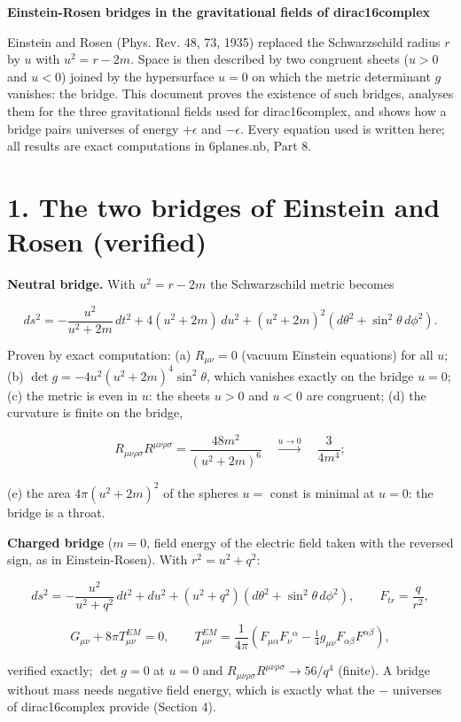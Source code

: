\documentclass[10pt]{article}
\makeatletter
\newcommand\keepnext{\par\nopagebreak\@nobreaktrue\everypar{\@nobreakfalse\everypar{}}}
\makeatother
\begin{document}
{\raggedright\LARGE\bfseries Einstein-Rosen bridges in the gravitational fields of dirac16complex\par}\medskip

Einstein and Rosen (Phys. Rev. 48, 73, 1935) replaced the Schwarzschild radius $r$ by $u$ with $u^2 = r - 2m$. Space is then described by two congruent sheets ($u>0$ and $u<0$) joined by the hypersurface $u = 0$ on which the metric determinant $g$ vanishes: the bridge. This document proves the existence of such bridges, analyses them for the three gravitational fields used for dirac16complex, and shows how a bridge pairs universes of energy $+\epsilon$ and $-\epsilon$. Every equation used is written here; all results are exact computations in 6planes.nb, Part 8.


\section*{1. The two bridges of Einstein and Rosen (verified)}

\textbf{Neutral bridge.} With $u^2 = r - 2m$ the Schwarzschild metric becomes\keepnext


\[
ds^2 = -\frac{u^2}{u^2+2m}\,dt^2 + 4(u^2+2m)\,du^2 + (u^2+2m)^2\left(d\theta^2 + \sin^2\theta\,d\phi^2\right).
\]

Proven by exact computation: (a) $R_{\mu\nu} = 0$ (vacuum Einstein equations) for all $u$; (b) $\det g = -4u^2(u^2+2m)^4\sin^2\theta$, which vanishes exactly on the bridge $u = 0$; (c) the metric is even in $u$: the sheets $u>0$ and $u<0$ are congruent; (d) the curvature is finite on the bridge,\keepnext


\[
R_{\mu\nu\rho\sigma}R^{\mu\nu\rho\sigma} = \frac{48m^2}{(u^2+2m)^6}\quad\xrightarrow{u\to0}\quad\frac{3}{4m^4};
\]

(e) the area $4\pi(u^2+2m)^2$ of the spheres $u = $ const is minimal at $u = 0$: the bridge is a throat.


\textbf{Charged bridge} ($m = 0$, field energy of the electric field taken with the reversed sign, as in Einstein-Rosen). With $r^2 = u^2 + q^2$:\keepnext


\[
ds^2 = -\frac{u^2}{u^2+q^2}\,dt^2 + du^2 + (u^2+q^2)\left(d\theta^2+\sin^2\theta\,d\phi^2\right),\qquad F_{tr} = \frac{q}{r^2},
\]

\[
G_{\mu\nu} + 8\pi T^{EM}_{\mu\nu} = 0,\qquad T^{EM}_{\mu\nu} = \frac1{4\pi}\left(F_{\mu\alpha}F_\nu{}^\alpha - \tfrac14g_{\mu\nu}F_{\alpha\beta}F^{\alpha\beta}\right),
\]

verified exactly; $\det g = 0$ at $u = 0$ and $R_{\mu\nu\rho\sigma}R^{\mu\nu\rho\sigma}\to 56/q^4$ (finite). A bridge without mass needs negative field energy, which is exactly what the $-$ universes of dirac16complex provide (Section 4).
\end{document}
